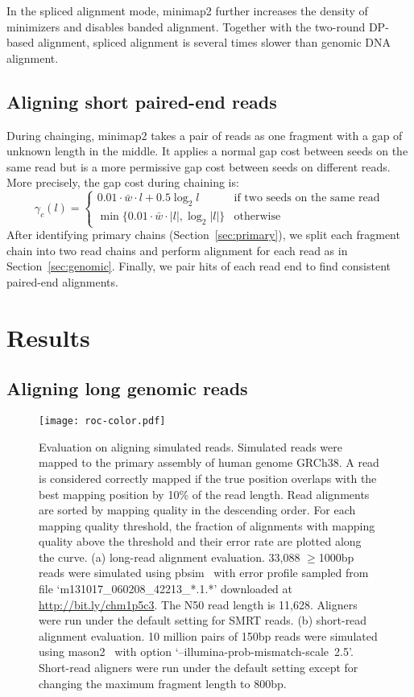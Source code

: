 \documentclass{bioinfo}
\begin{document}
\begin{methods}
In the spliced alignment mode, minimap2 further increases the density of
minimizers and disables banded alignment. Together with the two-round DP-based
alignment, spliced alignment is several times slower than genomic DNA
alignment.

\subsection{Aligning short paired-end reads}

During chainging, minimap2 takes a pair of reads as one fragment with a gap of
unknown length in the middle. It applies a normal gap cost between seeds on the
same read but is a more permissive gap cost between seeds on different reads.
More precisely, the gap cost during chaining is:
\[
\gamma_c(l)=\left\{\begin{array}{ll}
0.01\cdot\bar{w}\cdot l+0.5\log_2 l & \mbox{if two seeds on the same read} \\
\min\{0.01\cdot\bar{w}\cdot|l|,\log_2|l|\} & \mbox{otherwise}
\end{array}\right.
\]
After identifying primary chains (Section~\ref{sec:primary}), we split each
fragment chain into two read chains and perform alignment for each read as in
Section~\ref{sec:genomic}.  Finally, we pair hits of each read end to find
consistent paired-end alignments.

\end{methods}

\section{Results}

\subsection{Aligning long genomic reads}\label{sec:long-genomic}

\begin{figure}[!tb]
\centering
\texttt{[image: roc-color.pdf]}
\caption{Evaluation on aligning simulated reads. Simulated reads were mapped 
to the primary assembly of human genome GRCh38. A read is considered correctly
mapped if the true position overlaps with the best mapping position by 10\% of
the read length. Read alignments are sorted by mapping quality in the
descending order. For each mapping quality threshold, the fraction of
alignments with mapping quality above the threshold and their error rate are
plotted along the curve. (a) long-read alignment evaluation. 33,088 $\ge$1000bp
reads were simulated using pbsim~\citep{Ono:2013aa} with error profile sampled
from file `m131017\_060208\_42213\_*.1.*' downloaded at
\href{http://bit.ly/chm1p5c3}{http://bit.ly/chm1p5c3}. The N50 read length is
11,628. Aligners were run under the default setting for SMRT reads.
(b) short-read alignment evaluation. 10 million pairs of 150bp reads were
simulated using mason2~\citep{Holtgrewe:2010aa} with option
`\mbox{--illumina-prob-mismatch-scale 2.5}'. Short-read aligners were run under the
default setting except for changing the maximum fragment length to
800bp.}\label{fig:eval}
\end{figure}
\end{document}
